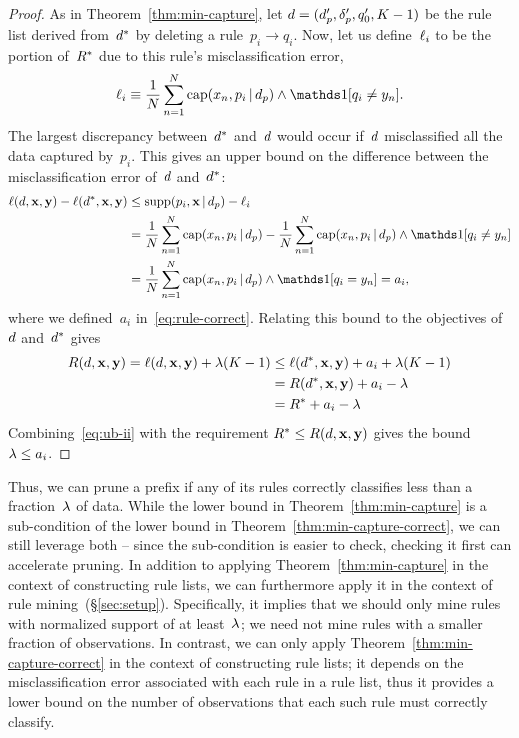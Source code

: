 \begin{arxiv}
\begin{proof}
As in Theorem~\ref{thm:min-capture},
let ${{d} =  (d_p', \delta_p', q_0', K-1)}$ be the rule list
derived from~$d^*$ by deleting a rule~${p_i \rightarrow q_i}$.
%
Now, let us define~$\ell_i$ to be the portion of~$R^*$
due to this rule's misclassification error,
\begin{align}
\Loss_i \equiv \frac{1}{N} \sum_{n=1}^N
  \Cap(x_n, p_i \given \Prefix) \wedge \one [ q_i \neq y_n ].
\end{align}
The largest discrepancy between~$d^*$ and~${d}$ would
occur if~${d}$ misclassified all the data captured by~$p_i$.
%
This gives an upper bound on the difference between
the misclassification error of~${d}$ and~$d^*$:
\begin{align}
\Loss(\RL, \x, \y) - \Loss(\OptimalRL, \x, \y)
&\le \Supp(p_i, \x \given \Prefix) - \Loss_i \nn \\
&= \frac{1}{N} \sum_{n=1}^N \Cap(x_n, p_i \given \Prefix)
  - \frac{1}{N} \sum_{n=1}^N
  \Cap(x_n, p_i \given \Prefix) \wedge \one [ q_i \neq y_n ] \nn \\
&= \frac{1}{N} \sum_{n=1}^N
  \Cap(x_n, p_i \given \Prefix) \wedge \one [ q_i = y_n ] = a_i,
\end{align}
where we defined~$a_i$ in~\eqref{eq:rule-correct}.
%
Relating this bound to the objectives of~${d}$ and~$d^*$ gives
\begin{align}
R({d}, \mathbf{x}, \mathbf{y}) = \ell({d}, \mathbf{x}, \mathbf{y}) + {\lambda} (K - 1)
&\le \ell(d^*, \mathbf{x}, \mathbf{y}) + a_i + {\lambda}(K - 1) \nonumber \\
&= R(d^*, \mathbf{x}, \mathbf{y}) + a_i - {\lambda} \nonumber \\
&= R^* + a_i - {\lambda}
\label{eq:ub-ii}
\end{align}
Combining~\eqref{eq:ub-ii} with the requirement
${R^* \le R({d}, \mathbf{x}, \mathbf{y})}$ gives the bound~${{\lambda} \le a_i}$.
\end{proof}
\end{arxiv}

Thus, we can prune a prefix if any of its rules correctly classifies
less than a fraction~${\lambda}$ of data.
%
While the lower bound in Theorem~\ref{thm:min-capture} is a sub-condition
of the lower bound in Theorem~\ref{thm:min-capture-correct},
we can still leverage both -- since the sub-condition is easier to check,
checking it first can accelerate pruning.
%
In addition to applying Theorem~\ref{thm:min-capture} in the context of
constructing rule lists, we can furthermore apply it in the context of
rule mining~(\S\ref{sec:setup}).
%
Specifically, it implies that we should only mine rules with
normalized support of at least~${\lambda}$;
we need not mine rules with a smaller fraction of observations.
%
In contrast, we can only apply Theorem~\ref{thm:min-capture-correct}
in the context of constructing rule lists;
it depends on the misclassification error associated with each
rule in a rule list, thus it provides a lower bound on the number of
observations that each such rule must correctly classify.

